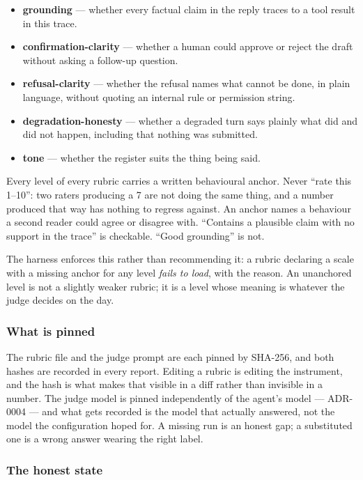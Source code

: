 \documentclass[11pt,a4paper]{article}
\begin{document}
\begin{itemize}[leftmargin=1.4em,itemsep=0.2em]
\item \textbf{grounding} --- whether every factual claim in the reply traces to a tool result in this trace.
\item \textbf{confirmation-clarity} --- whether a human could approve or reject the draft without asking a follow-up question.
\item \textbf{refusal-clarity} --- whether the refusal names what cannot be done, in plain language, without quoting an internal rule or permission string.
\item \textbf{degradation-honesty} --- whether a degraded turn says plainly what did and did not happen, including that nothing was submitted.
\item \textbf{tone} --- whether the register suits the thing being said.
\end{itemize}

Every level of every rubric carries a written behavioural anchor. Never ``rate this 1--10'': two raters producing a 7 are not doing the same thing, and a number produced that way has nothing to regress against. An anchor names a behaviour a second reader could agree or disagree with. ``Contains a plausible claim with no support in the trace'' is checkable. ``Good grounding'' is not.

The harness enforces this rather than recommending it: a rubric declaring a scale with a missing anchor for any level \emph{fails to load}, with the reason. An unanchored level is not a slightly weaker rubric; it is a level whose meaning is whatever the judge decides on the day.

\subsubsection*{What is pinned}

The rubric file and the judge prompt are each pinned by SHA-256, and both hashes are recorded in every report. Editing a rubric is editing the instrument, and the hash is what makes that visible in a diff rather than invisible in a number. The judge model is pinned independently of the agent's model --- ADR-0004 --- and what gets recorded is the model that actually answered, not the model the configuration hoped for. A missing run is an honest gap; a substituted one is a wrong answer wearing the right label.

\subsubsection*{The honest state}
\end{document}
